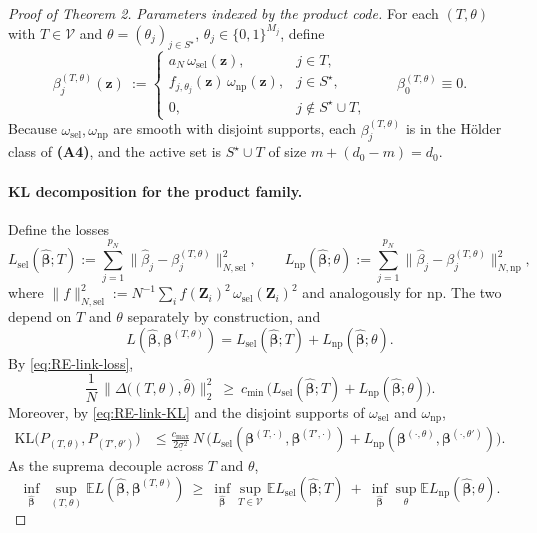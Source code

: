 \documentclass[11pt]{article}
\newcommand{\E}{\mathbb{E}} %
\theoremstyle{plain}
\theoremstyle{definition}
\theoremstyle{plain}
\begin{document}
\begin{proof}[Proof of Theorem 2]
\smallskip
\emph{Parameters indexed by the product code.}
For each $(T,\theta)$ with $T\in\mathcal V$ and $\theta=(\theta_j)_{j\in S^\star}$, $\theta_j\in\{0,1\}^{M_j}$, define
\[
\beta_j^{(T,\theta)}(\bm z)\ :=
\begin{cases}
a_N\,\omega_{\mathrm{sel}}(\bm z), & j\in T,\\[3pt]
f_{j,\theta_j}(\bm z)\,\omega_{\mathrm{np}}(\bm z), & j\in S^\star,\\[3pt]
0, & j\notin S^\star\cup T,
\end{cases}
\qquad \beta_0^{(T,\theta)}\equiv 0.
\]
Because $\omega_{\mathrm{sel}},\omega_{\mathrm{np}}$ are smooth with disjoint supports, each $\beta_j^{(T,\theta)}$ is in the Hölder class of {\textbf{(A4)}}, and the active set is $S^\star\cup T$ of size $m+(d_0-m)=d_0$.

\paragraph{KL decomposition for the product family.}
Define the losses
\[
L_{\mathrm{sel}}(\widehat{\bm\beta};T):=\sum_{j=1}^{p_N}\|\widehat\beta_j-\beta_j^{(T,\theta)}\|_{N,\mathrm{sel}}^2,\qquad
L_{\mathrm{np}}(\widehat{\bm\beta};\theta):=\sum_{j=1}^{p_N}\|\widehat\beta_j-\beta_j^{(T,\theta)}\|_{N,\mathrm{np}}^2,
\]
where $\|f\|_{N,\mathrm{sel}}^2:=N^{-1}\sum_i f(\bm Z_i)^2\,\omega_{\mathrm{sel}}(\bm Z_i)^2$ and analogously for $\mathrm{np}$. The two depend on $T$ and $\theta$ separately by construction, and
\begin{equation}\label{eq:loss-sum}
L(\widehat{\bm\beta},\bm\beta^{(T,\theta)})=L_{\mathrm{sel}}(\widehat{\bm\beta};T)+L_{\mathrm{np}}(\widehat{\bm\beta};\theta).
\end{equation}
By \eqref{eq:RE-link-loss},
\begin{equation}\label{eq:loss-lower-Delta}
\frac{1}{N}\,\big\|\Delta\big((T,\theta),\widehat\theta\big)\big\|_2^2
\ \ge\ c_{\min}\,\Big( L_{\mathrm{sel}}(\widehat{\bm\beta};T)+L_{\mathrm{np}}(\widehat{\bm\beta};\theta)\Big).
\end{equation}
Moreover, by \eqref{eq:RE-link-KL} and the disjoint supports of $\omega_{\mathrm{sel}}$ and $\omega_{\mathrm{np}}$,
\begin{align}
\mathrm{KL}\big(P_{(T,\theta)},P_{(T',\theta')}\big)
&\le \frac{c_{\max}}{2\underline\sigma^2}\,N\,
\Big( L_{\mathrm{sel}}(\bm\beta^{(T,\cdot)},\bm\beta^{(T',\cdot)})
     +L_{\mathrm{np}}(\bm\beta^{(\cdot,\theta)},\bm\beta^{(\cdot,\theta')})\Big).
\label{eq:KL-sum}
\end{align}
As the suprema decouple across $T$ and $\theta$,
\begin{equation}\label{eq:inf-sup-sum}
\inf_{\widehat{\bm\beta}}\ \sup_{(T,\theta)} \E L(\widehat{\bm\beta},\bm\beta^{(T,\theta)})
\ \ge\
\inf_{\widehat{\bm\beta}} \sup_{T\in\mathcal V}\E L_{\mathrm{sel}}(\widehat{\bm\beta};T)
\ +\
\inf_{\widehat{\bm\beta}} \sup_{\theta}\E L_{\mathrm{np}}(\widehat{\bm\beta};\theta).
\end{equation}


\end{proof}
\end{document}
